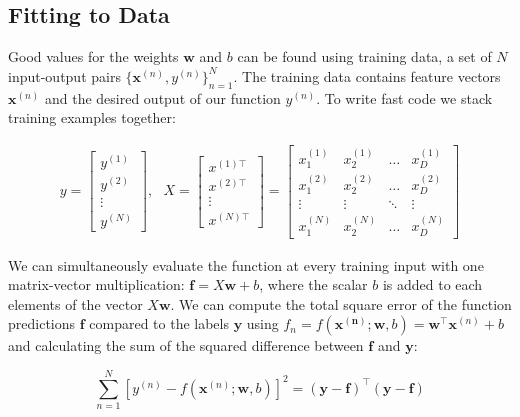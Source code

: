 \documentclass{article}
\begin{document}
\subsection{Fitting to Data}

Good values for the weights $\mathbf{w}$ and $b$ can be found using training data, a set of $N$ input-output pairs $\{\mathbf{x}^{(n)},y^{(n)}\}^{N}_{n=1}$.
The training data contains feature vectors $\mathbf{x}^{(n)}$ and the desired output of our function $y^{(n)}$.
To write fast code we stack training examples together:

  \begin{align}
    y = \begin{bmatrix}
           y^{(1)} \\
           y^{(2)} \\
           \vdots \\
           y^{(N)}
         \end{bmatrix}, \text{ }
    X = \begin{bmatrix}
           x^{(1) \top} \\
           x^{(2) \top}  \\
           \vdots \\
           x^{(N)\top} 
         \end{bmatrix}
      = \begin{bmatrix}
           x_{1}^{(1)} & x_{2}^{(1)} & \dots & x_{D}^{(1)} \\
           x_{1}^{(2)} & x_{2}^{(2)} & \dots & x_{D}^{(2)} \\
           \vdots & \vdots & \ddots & \vdots\\
           x_{1}^{(N)} & x_{2}^{(N)} & \dots & x_{D}^{(N)}
         \end{bmatrix}
  \end{align}
  
We can simultaneously evaluate the function at every training input with one matrix-vector multiplication: $\mathbf{f}=X\mathbf{w}+b$, where the scalar $b$ is added to each elements of the vector $X\mathbf{w}$.
We can compute the total square error of the function predictions $\mathbf{f}$ compared to the labels $\mathbf{y}$ using $f_n = f(\mathbf{x^{(n)}}; \mathbf{w}, b) = \mathbf{w}^\top \mathbf{x}^{(n)}+b$ and calculating the sum of the squared difference between $\mathbf{f}$ and $\mathbf{y}$:

\[
\sum^{N}_{n=1} [y^{(n)}-f(\mathbf{x}^{(n)}; \mathbf{w}, b)]^2 = (\mathbf{y}-\mathbf{f})^\top (\mathbf{y} - \mathbf{f})
\]
\end{document}

